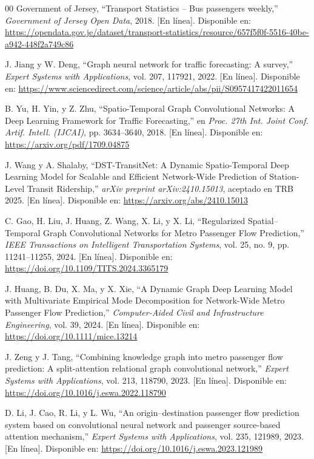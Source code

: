 \documentclass[preprint,12pt]{elsarticle}
\begin{document}
\begin{thebibliography}{00}
Government of Jersey, ``Transport Statistics -- Bus passengers weekly,'' \textit{Government of Jersey Open Data}, 2018. [En línea]. Disponible en: \url{https://opendata.gov.je/dataset/transport-statistics/resource/657f5f0f-5516-40be-a942-448f2a749c86}

J. Jiang y W. Deng, ``Graph neural network for traffic forecasting: A survey,'' \textit{Expert Systems with Applications}, vol. 207, 117921, 2022. [En línea]. Disponible en: \url{https://www.sciencedirect.com/science/article/abs/pii/S0957417422011654}

B. Yu, H. Yin, y Z. Zhu, ``Spatio-Temporal Graph Convolutional Networks: A Deep Learning Framework for Traffic Forecasting,'' en \textit{Proc. 27th Int. Joint Conf. Artif. Intell. (IJCAI)}, pp. 3634--3640, 2018. [En línea]. Disponible en: \url{https://arxiv.org/pdf/1709.04875}

J. Wang y A. Shalaby, ``DST-TransitNet: A Dynamic Spatio-Temporal Deep Learning Model for Scalable and Efficient Network-Wide Prediction of Station-Level Transit Ridership,'' \textit{arXiv preprint arXiv:2410.15013}, aceptado en TRB 2025. [En línea]. Disponible en: \url{https://arxiv.org/abs/2410.15013}

C. Gao, H. Liu, J. Huang, Z. Wang, X. Li, y X. Li, ``Regularized Spatial--Temporal Graph Convolutional Networks for Metro Passenger Flow Prediction,'' \textit{IEEE Transactions on Intelligent Transportation Systems}, vol. 25, no. 9, pp. 11241--11255, 2024. [En línea]. Disponible en: \url{https://doi.org/10.1109/TITS.2024.3365179}

J. Huang, B. Du, X. Ma, y X. Xie, ``A Dynamic Graph Deep Learning Model with Multivariate Empirical Mode Decomposition for Network-Wide Metro Passenger Flow Prediction,'' \textit{Computer-Aided Civil and Infrastructure Engineering}, vol. 39, 2024. [En línea]. Disponible en: \url{https://doi.org/10.1111/mice.13214}

J. Zeng y J. Tang, ``Combining knowledge graph into metro passenger flow prediction: A split-attention relational graph convolutional network,'' \textit{Expert Systems with Applications}, vol. 213, 118790, 2023. [En línea]. Disponible en: \url{https://doi.org/10.1016/j.eswa.2022.118790}

D. Li, J. Cao, R. Li, y L. Wu, ``An origin--destination passenger flow prediction system based on convolutional neural network and passenger source-based attention mechanism,'' \textit{Expert Systems with Applications}, vol. 235, 121989, 2023. [En línea]. Disponible en: \url{https://doi.org/10.1016/j.eswa.2023.121989}


\end{thebibliography}
\end{document}
